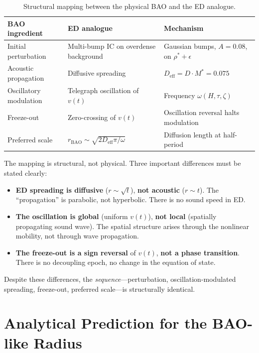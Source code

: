 \documentclass[11pt]{article}
\begin{document}
\begin{table}[h]
\centering
\begin{tabular}{@{}lll@{}}
\toprule
BAO ingredient & ED analogue & Mechanism \\
\midrule
Initial perturbation & Multi-bump IC on overdense background & Gaussian bumps, \(A = 0.08\), on \(\rho^* + \epsilon\) \\
Acoustic propagation & Diffusive spreading & \(D_{\mathrm{eff}} = D \cdot M^* = 0.075\) \\
Oscillatory modulation & Telegraph oscillation of \(v(t)\) & Frequency \(\omega(H, \tau, \zeta)\) \\
Freeze-out & Zero-crossing of \(v(t)\) & Oscillation reversal halts modulation \\
Preferred scale & \(r_{\mathrm{BAO}} \sim \sqrt{2 D_{\mathrm{eff}} \pi / \omega}\) & Diffusion length at half-period \\
\bottomrule
\end{tabular}
\caption{Structural mapping between the physical BAO and the ED analogue.}
\label{tab:mapping}
\end{table}

The mapping is structural, not physical. Three important differences must be stated clearly:

\begin{itemize}
  \item \textbf{ED spreading is diffusive} (\(r \sim \sqrt{t}\)), \textbf{not acoustic} (\(r \sim t\)). The ``propagation'' is parabolic, not hyperbolic. There is no sound speed in ED.
  \item \textbf{The oscillation is global} (uniform \(v(t)\)), \textbf{not local} (spatially propagating sound wave). The spatial structure arises through the nonlinear mobility, not through wave propagation.
  \item \textbf{The freeze-out is a sign reversal} of \(v(t)\), \textbf{not a phase transition}. There is no decoupling epoch, no change in the equation of state.
\end{itemize}

Despite these differences, the \emph{sequence}---perturbation, oscillation-modulated spreading, freeze-out, preferred scale---is structurally identical.

\section{Analytical Prediction for the BAO-like Radius}
\end{document}
